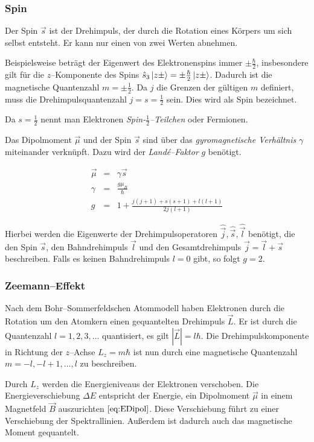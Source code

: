 \documentclass[12pt,a4paper]{scrartcl}
\numberwithin{equation}{section} %
\begin{document}
\hypertarget{spin}{%
\subsubsection{Spin}\label{spin}}

Der Spin $\vec s$ ist der Drehimpuls, der durch die Rotation eines
Körpers um sich selbst entsteht. Er kann nur einen von zwei Werten
abnehmen.

Beispielsweise beträgt der Eigenwert des Elektronenspins immer
$\pm\frac{\hbar}{2}$, insbesondere gilt für die $z$--Komponente des
Spins $\hat s_3\ket{z\pm}=\pm\frac{\hbar}{2}\ket{z\pm}$. Dadurch ist
die magnetische Quantenzahl $m=\pm\frac{1}{2}$. Da $j$ die Grenzen
der gültigen $m$ definiert, muss die Drehimpulsquantenzahl
$j=s=\frac{1}{2}$ sein. Dies wird als Spin bezeichnet.

Da $s=\frac{1}{2}$ nennt man Elektronen
\emph{Spin-$\frac{1}{2}$--Teilchen} oder Fermionen.

Das Dipolmoment $\vec \mu$ und der Spin $\vec s$ sind über das
\emph{gyromagnetische Verhältnis} $\gamma$ miteinander verknüpft. Dazu
wird der \emph{Landé--Faktor} $g$ benötigt.

\begin{eqnarray}
    \vec \mu &=& \gamma \vec{s} \\
    \gamma &=& \frac{g\mu_B}{\hbar} \\
    g &=& 1 + \frac{j(j+1) + s(s+1) + l(l+1)}{2j(l+1)}
\end{eqnarray}

Hierbei werden die Eigenwerte der Drehimpulsoperatoren
$\hat{\vec j},\hat{\vec s},\hat{\vec l}$ benötigt, die den Spin
$\vec s$, den Bahndrehimpuls $\vec l$ und den Gesamtdrehimpuls
$\vec j = \vec l + \vec s$ beschreiben. Falls es keinen Bahndrehimpuls
$l=0$ gibt, so folgt $g=2$.

\hypertarget{zeemanneffekt}{%
\subsubsection{Zeemann--Effekt}\label{zeemanneffekt}}

Nach dem Bohr--Sommerfeldschen Atommodell haben Elektronen durch die
Rotation um den Atomkern einen gequantelten Drehimpuls $\vec{L}$. Er
ist durch die Quantenzahl $l=1,2,3,\dots$ quantisiert, es gilt
$|\vec{L}| = l\hbar$. Die Drehimpulskomponente in Richtung der
$z$--Achse $L_z=m\hbar$ ist nun durch eine magnetische Quantenzahl
$m=-l,-l+1,\dots,l$ zu beschreiben.

Durch $L_z$ werden die Energieniveaus der Elektronen verschoben. Die
Energieverschiebung $\Delta E$ entspricht der Energie, ein Dipolmoment
$\vec \mu$ in einem Magnetfeld $\vec B$ auszurichten
$\eqref{eq:EDipol}$. Diese Verschiebung führt zu einer Verschiebung
der Spektrallinien. Außerdem ist dadurch auch das magnetische Moment
gequantelt.
\end{document}
